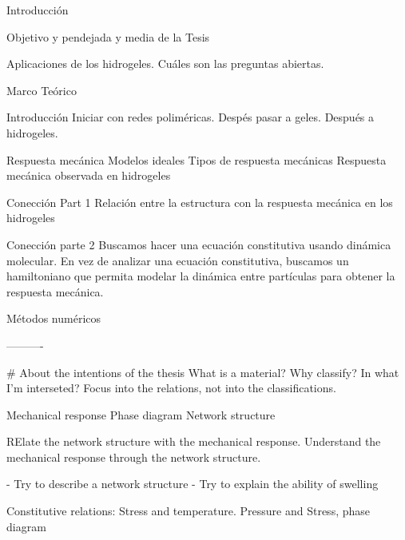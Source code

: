 Introducción

Objetivo y pendejada y media de la Tesis

Aplicaciones de los hidrogeles.
Cuáles son las preguntas abiertas.



Marco Teórico

Introducción
Iniciar con redes poliméricas.
Despés pasar a geles.
Después a hidrogeles.

Respuesta mecánica
Modelos ideales
Tipos de respuesta mecánicas
Respuesta mecánica observada en hidrogeles

Conección Part 1
Relación entre la estructura con la respuesta mecánica en los hidrogeles

Conección parte 2
Buscamos hacer una ecuación constitutiva usando dinámica molecular.
En vez de analizar una ecuación constitutiva, buscamos un hamiltoniano que permita modelar la dinámica entre partículas para obtener la respuesta mecánica.


Métodos numéricos

----------

# About the intentions of the thesis
What is a material?
Why classify?
In what I'm interseted?
Focus into the relations, not into the classifications.

Mechanical response
Phase diagram
Network structure

RElate the network structure with the mechanical response.
Understand the mechanical response through the network structure.

- Try to describe a network structure
- Try to explain the ability of swelling

Constitutive relations: Stress and temperature.
Pressure and Stress, phase diagram


